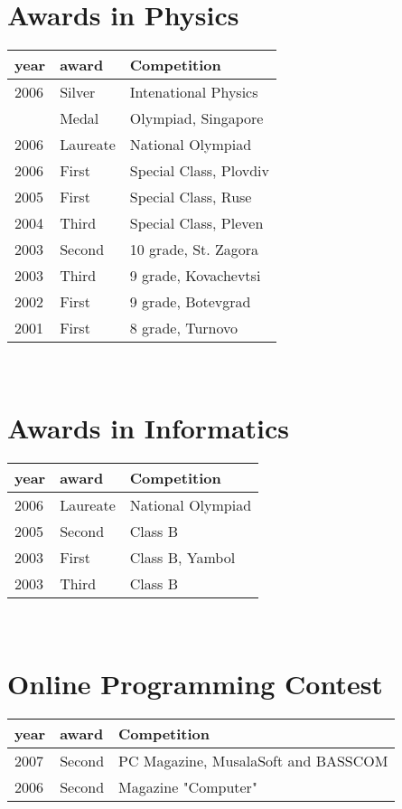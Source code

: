 \section*{Awards in Physics}
\begin{tabular}{ p{} p{} p{} }
year & award & Competition \\
\hline
2006 & Silver  & Intenational Physics \\
     & Medal   & Olympiad, Singapore  \\
2006 & Laureate& National Olympiad\\
2006 & First   & Special Class, Plovdiv  \\
2005 & First   & Special Class, Ruse     \\
2004 & Third   & Special Class, Pleven   \\
2003 & Second  & 10 grade, St. Zagora  \\
2003 & Third   & 9 grade,  Kovachevtsi   \\
2002 & First   & 9 grade,  Botevgrad     \\
2001 & First   & 8 grade,  Turnovo\\
\end{tabular}\\
\section*{Awards in Informatics}
\begin{tabular}{ p{} p{} p{} }
year & award & Competition \\
\hline
2006 & Laureate  & National Olympiad \\
2005 & Second    & Class B \\
2003 & First     & Class B, Yambol \\
2003 & Third     & Class B \\
\end{tabular}\\
\section*{Online Programming Contest}
\begin{tabular}{ p{} p{} p{} }
year & award & Competition \\
\hline
2007 & Second    & PC Magazine, MusalaSoft and BASSCOM \\
2006 & Second    & Magazine "Computer"\\
\end{tabular}\\
